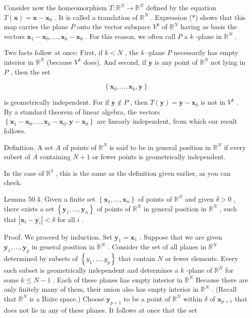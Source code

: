 \documentclass[10pt]{article}
\begin{document}
Consider now the homeomorphism \(T : {\mathbb{R}}^{N} \rightarrow  {\mathbb{R}}^{N}\) defined by the equation \(T\left( \mathbf{x}\right)  = \mathbf{x} - {\mathbf{x}}_{0}\) . It is called a translation of \({\mathbb{R}}^{N}\) . Expression (*) shows that this map carries the plane \(P\) onto the vector subspace \({V}^{k}\) of \({\mathbb{R}}^{N}\) having as basis the vectors \({\mathbf{x}}_{1} - {\mathbf{x}}_{0},\ldots ,{\mathbf{x}}_{k} - {\mathbf{x}}_{0}\) . For this reason, we often call \(P\) a \(k\) -plane in \({\mathbb{R}}^{N}\) .

Two facts follow at once: First, if \(k < N\) , the \(k\) -plane \(P\) necessarily has empty interior in \({\mathbb{R}}^{N}\) (because \({V}^{k}\) does). And second, if \(\mathbf{y}\) is any point of \({\mathbb{R}}^{N}\) not lying in \(P\) , then the set

\[
\left\{  {{\mathbf{x}}_{0},\ldots ,{\mathbf{x}}_{k},\mathbf{y}}\right\}
\]

is geometrically independent. For if \(\mathbf{y} \notin  P\) , then \(T\left( \mathbf{y}\right)  = \mathbf{y} - {\mathbf{x}}_{0}\) is not in \({V}^{k}\) . By a standard theorem of linear algebra, the vectors \(\left\{  {{\mathbf{x}}_{1} - {\mathbf{x}}_{0},\ldots ,{\mathbf{x}}_{k} - {\mathbf{x}}_{0},\mathbf{y} - {\mathbf{x}}_{0}}\right\}\) are linearly independent, from which our result follows.

Definition. A set \(A\) of points of \({\mathbb{R}}^{N}\) is said to be in general position in \({\mathbb{R}}^{N}\) if every subset of \(A\) containing \(N + 1\) or fewer points is geometrically independent.

In the case of \({\mathbb{R}}^{3}\) , this is the same as the definition given earlier, as you can check.

Lemma 50.4. Given a finite set \(\left\{  {{\mathbf{x}}_{1},\ldots ,{\mathbf{x}}_{n}}\right\}\) of points of \({\mathbb{R}}^{N}\) and given \(\delta  > 0\) , there exists a set \(\left\{  {{\mathbf{y}}_{1},\ldots ,{\mathbf{y}}_{n}}\right\}\) of points of \({\mathbb{R}}^{N}\) in general position in \({\mathbb{R}}^{N}\) , such that \(\left| {{\mathbf{x}}_{i} - {\mathbf{y}}_{i}}\right|  < \delta\) for all \(i\) .

Proof. We proceed by induction. Set \({\mathbf{y}}_{1} = {\mathbf{x}}_{1}\) . Suppose that we are given \({\mathbf{y}}_{1},\ldots ,{\mathbf{y}}_{p}\) in general position in \({\mathbb{R}}^{N}\) . Consider the set of all planes in \({\mathbb{R}}^{N}\) determined by subsets of \(\left\{  {{y}_{1},\ldots ,{y}_{p}}\right\}\) that contain \(N\) or fewer elements. Every such subset is geometrically independent and determines a \(k\) -plane of \({\mathbb{R}}^{N}\) for some \(k \leq  N - 1\) . Each of these planes has empty interior in \({\mathbb{R}}^{N}\) Because there are only finitely many of them, their union also has empty interior in \({\mathbb{R}}^{N}\) . (Recall that \({\mathbb{R}}^{N}\) is a Baire space.) Choose \({\mathbf{y}}_{p + 1}\) to be a point of \({\mathbb{R}}^{N}\) within \(\delta\) of \({\mathbf{x}}_{p + 1}\) that does not lie in any of these planes. It follows at once that the set
\end{document}
